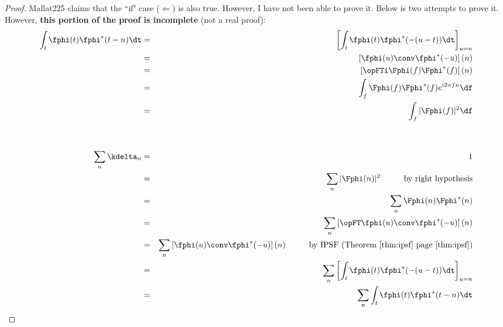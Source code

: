 \begin{proof}
Mallat\citep{mallat}{225} claims that the ``if" case ($\Longleftarrow$)
is also true.\attention
However, I have not been able to prove it. 
Below is two attempts to prove it.
However, {\bf this portion of the proof is incomplete} (not a real proof):
\begin{eqnarray*}
  \int_t \fphi(t)\fphi^\ast(t-n) \dt
    &=& \left[ \int_t \fphi(t)\fphi^\ast(-(u-t)) \dt \right]_{u=n}
  \\&=& \left[ \fphi(u) \conv \fphi^\ast(-u) \right](n)
  \\&=& \left[ \opFTi \Fphi(f) \Fphi^\ast(f) \right](n)
  \\&=& \int_f \Fphi(f) \Fphi^\ast(f) e^{i2\pi fn} \df
  \\&=& \int_f | \Fphi(f) |^2 \df
\\
\\
\\
  \sum_n \kdelta_n
    &=& 1
  \\&=& \sum_n |\Fphi(n)|^2
        \hspace{1cm}\mbox{by right hypothesis}
  \\&=& \sum_n \Fphi(n) \Fphi^\ast(n)
  \\&=& \sum_n \left[ \opFT \fphi(u) \conv \fphi^\ast(-u) \right](n)
  \\&=& \sum_n \left[ \fphi(u) \conv \fphi^\ast(-u) \right](n)
        \hspace{1cm}\mbox{by IPSF (Theorem~\ref{thm:ipsf} page~\pageref{thm:ipsf})}
  \\&=& \sum_n \left[ \int_t \fphi(t)\fphi^\ast(-(u-t)) \dt \right]_{u=n}
  \\&=& \sum_n \int_t \fphi(t) \fphi^\ast(t-n) \dt 
\end{eqnarray*}
\end{proof}








